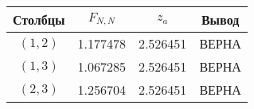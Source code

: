 \begin{changemargin}{-0cm}{0cm}\small{%
\center%
\begin{tabular}{|c|c|c|c|}%
\hline%
Столбцы&$F_{N,N}$&$z_a$&Вывод\\%
\hline%
$(1,2)$&1.177478&2.526451&ВЕРНА\\%
\hline%
$(1,3)$&1.067285&2.526451&ВЕРНА\\%
\hline%
$(2,3)$&1.256704&2.526451&ВЕРНА\\%
\hline%
\end{tabular}%
\newline%
\newline%
%
}\end{changemargin}